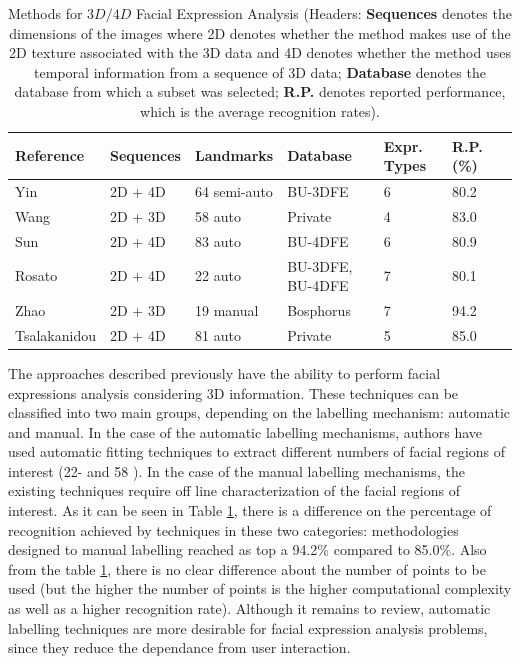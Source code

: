 \begin{table}[h]
\scriptsize
\begin{center}
\begin{tabular}{||p{2.7cm}|p{2.0cm}|p{2.0cm}|p{2.0cm}|p{1.5cm}|p{1.5cm}|p{1.5cm}||} \hline \hline
Reference & Sequences & Landmarks & Database & Expr. Types & R.P. (\%) \\ \hline \hline
\normalsize{Yin \cite{Yin2006}} & 2D + 4D & 64 semi-auto & BU-3DFE & 6 & 80.2 \\ \hline \hline
\normalsize{Wang \cite{Wang2007}} & 2D + 3D & 58 auto & Private & 4 & 83.0 \\ \hline \hline
\normalsize{Sun \cite{SunFer2008}} & 2D + 4D & 83 auto & BU-4DFE & 6 & 80.9 \\ \hline \hline
\normalsize{Rosato \cite{Rosato2008}} & 2D + 4D & 22 auto & BU-3DFE, BU-4DFE & 7 & 80.1 \\ \hline \hline
\normalsize{Zhao \cite{Zhao01}} & 2D + 3D & 19 manual & Bosphorus & 7 & 94.2 \\ \hline \hline
\normalsize{Tsalakanidou \cite{Tsalakanidou2010}} & 2D + 4D & 81 auto & Private & 5 & 85.0 \\ \hline \hline
\end{tabular}
\end{center}
\caption[Methods for $3D/4D$ Facial Expression Analysis]{Methods for $3D/4D$ Facial Expression Analysis (\footnotesize{Headers: \textbf{Sequences} denotes the dimensions of the images where 2D denotes whether the method makes use of the 2D texture associated with the 3D data and 4D denotes whether the method uses temporal information from a sequence of 3D data; \textbf{Database} denotes the database from which a subset was selected; \textbf{R.P.} denotes reported performance, which is the average recognition rates}).}
\label{tb:3DLocalTechniques}
\end{table}

The approaches described previously have the ability to perform facial expressions analysis considering 3D information. These techniques can be classified into two main groups, depending on the labelling mechanism: automatic and manual. In the case of the automatic labelling mechanisms, authors have used automatic fitting techniques to extract different numbers of facial regions of interest (22- \cite{Rosato2008} and 58 \cite{Wang2007}). In the case of the manual labelling mechanisms, the existing techniques require off line characterization of the facial regions of interest. As it can be seen in Table \ref{tb:3DLocalTechniques}, there is a difference on the percentage of recognition achieved by techniques in these two categories: methodologies designed to manual labelling reached as top a 94.2\% compared to 85.0\%. Also from the table \ref{tb:3DLocalTechniques}, there is no clear difference about the number of points to be used (but the higher the number of points is the higher computational complexity as well as a higher recognition rate). Although it remains to review, automatic labelling techniques are more desirable for facial expression analysis problems, since they reduce the dependance from user interaction.
